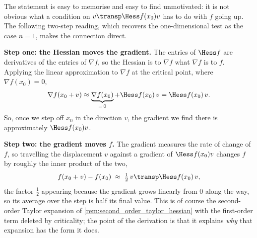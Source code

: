\begin{remark}
\label{rem:hessian_test_intuition}
The statement is easy to memorise and easy to find unmotivated: it is not obvious what a
condition on $v\transp \Hess f(x_0) v$ has to do with $f$ going up. The following two-step
reading, which recovers the one-dimensional test as the case $n=1$, makes the connection direct.

\textbf{Step one: the Hessian moves the gradient.} The entries of $\Hess f$ are derivatives of
the entries of $\nabla f$, so the Hessian is to $\nabla f$ what $\nabla f$ is to $f$. Applying
the linear approximation to $\nabla f$ at the critical point, where $\nabla f(x_0) = 0$,
\[\nabla f(x_0+v) \approx \underbrace{\nabla f(x_0)}_{=\,0} + \Hess f(x_0)\,v = \Hess f(x_0)\,v.\]
So, once we step off $x_0$ in the direction $v$, the gradient we find there is approximately
$\Hess f(x_0)v$.

\textbf{Step two: the gradient moves $f$.} The gradient measures the rate of change of $f$, so
travelling the displacement $v$ against a gradient of $\Hess f(x_0)v$ changes $f$ by roughly the
inner product of the two,
\[f(x_0+v) - f(x_0) \;\approx\; \tfrac12\,v\transp \Hess f(x_0)\,v,\]
the factor $\tfrac12$ appearing because the gradient grows linearly from $0$ along the way, so
its average over the step is half its final value. This is of course the second-order Taylor
expansion of \cref{rem:second_order_taylor_hessian} with the first-order term deleted by
criticality; the point of the derivation is that it explains \emph{why} that expansion has the
form it does.


\end{remark}

